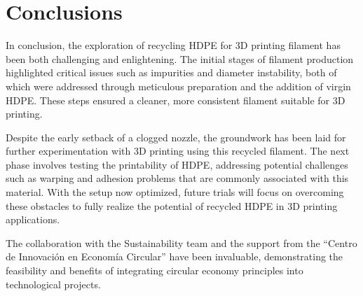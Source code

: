\section{Conclusions}
In conclusion, the exploration of recycling HDPE for 3D printing filament has been both 
challenging and enlightening. The initial stages of filament production highlighted critical 
issues such as impurities and diameter instability, both of which were addressed through 
meticulous preparation and the addition of virgin HDPE. These steps ensured a cleaner, more 
consistent filament suitable for 3D printing.

Despite the early setback of a clogged nozzle, the groundwork has been laid for further 
experimentation with 3D printing using this recycled filament. The next phase involves testing the 
printability of HDPE, addressing potential challenges such as warping and adhesion problems that 
are commonly associated with this material. With the setup now optimized, future trials will focus 
on overcoming these obstacles to fully realize the potential of recycled HDPE in 3D printing 
applications.

The collaboration with the Sustainability team and the support from the ``Centro de Innovación en 
Economía Circular'' have been invaluable, demonstrating the feasibility and benefits of 
integrating circular economy principles into technological projects.
